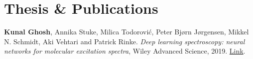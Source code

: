 \documentclass[]{deedy-resume}
\begin{document}
\begin{minipage}[t]{0.62\textwidth}
\sectionsep

\sectionsep

\sectionsep



\section{Thesis \& Publications} 
\renewcommand\refname{\vskip -1.5cm} %
%
%
\small{
\textbullet{} \textbf{Kunal Ghosh}, Annika Stuke, Milica Todorovi\'c, Peter Bj{\o}rn J{\o}rgensen, Mikkel N. Schmidt, Aki Vehtari and Patrick Rinke.  \textit{Deep learning spectroscopy: neural networks for molecular excitation spectra}, Wiley Advanced Science, 2019. \href{https://onlinelibrary.wiley.com/doi/full/10.1002/advs.201801367}{Link}.
\sectionsep

}
\end{minipage}
\end{document}
